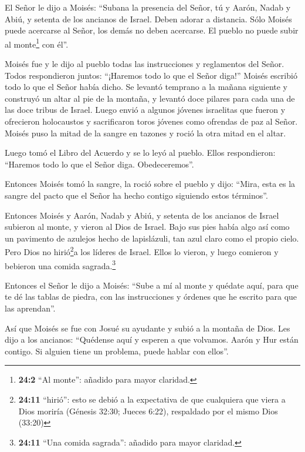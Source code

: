  El Señor le dijo a Moisés: ``Subana la presencia del Señor,
tú y Aarón, Nadab y Abiú, y setenta de los ancianos de Israel. Deben
adorar a distancia.  Sólo Moisés puede acercarse al Señor,
los demás no deben acercarse. El pueblo no puede subir al
monte\footnote{\textbf{24:2} ``Al monte'': añadido para mayor claridad.}
con él''.

 Moisés fue y le dijo al pueblo todas las instrucciones y
reglamentos del Señor. Todos respondieron juntos: ``¡Haremos todo lo que
el Señor diga!''  Moisés escribió todo lo que el Señor había
dicho. Se levantó temprano a la mañana siguiente y construyó un altar al
pie de la montaña, y levantó doce pilares para cada una de las doce
tribus de Israel.  Luego envió a algunos jóvenes israelitas
que fueron y ofrecieron holocaustos y sacrificaron toros jóvenes como
ofrendas de paz al Señor.  Moisés puso la mitad de la sangre
en tazones y roció la otra mitad en el altar.

 Luego tomó el Libro del Acuerdo y se lo leyó al pueblo.
Ellos respondieron: ``Haremos todo lo que el Señor diga. Obedeceremos''.

 Entonces Moisés tomó la sangre, la roció sobre el pueblo y
dijo: ``Mira, esta es la sangre del pacto que el Señor ha hecho contigo
siguiendo estos términos''.

 Entonces Moisés y Aarón, Nadab y Abiú, y setenta de los
ancianos de Israel subieron al monte,  y vieron al Dios de
Israel. Bajo sus pies había algo así como un pavimento de azulejos hecho
de lapislázuli, tan azul claro como el propio cielo.  Pero
Dios no hirió\footnote{\textbf{24:11} ``hirió'': esto se debió a la
  expectativa de que cualquiera que viera a Dios moriría (Génesis 32:30;
  Jueces 6:22), respaldado por el mismo Dios (33:20)}a los líderes de
Israel. Ellos lo vieron, y luego comieron y bebieron una comida
sagrada.\footnote{\textbf{24:11} ``Una comida sagrada'': añadido para
  mayor claridad.}

 Entonces el Señor le dijo a Moisés: ``Sube a mí al monte y
quédate aquí, para que te dé las tablas de piedra, con las instrucciones
y órdenes que he escrito para que las aprendan''.

 Así que Moisés se fue con Josué su ayudante y subió a la
montaña de Dios.  Les dijo a los ancianos: ``Quédense aquí
y esperen a que volvamos. Aarón y Hur están contigo. Si alguien tiene un
problema, puede hablar con ellos''.

